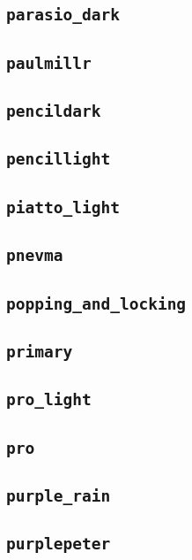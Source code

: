 \subsection{\texttt{parasio\_dark}}
\newpage
\subsection{\texttt{paulmillr}}
\newpage
\subsection{\texttt{pencildark}}
\newpage
\subsection{\texttt{pencillight}}
\newpage
\subsection{\texttt{piatto\_light}}
\newpage
\subsection{\texttt{pnevma}}
\newpage
\subsection{\texttt{popping\_and\_locking}}
\newpage
\subsection{\texttt{primary}}
\newpage
\subsection{\texttt{pro\_light}}
\newpage
\subsection{\texttt{pro}}
\newpage
\subsection{\texttt{purple\_rain}}
\newpage
\subsection{\texttt{purplepeter}}
\newpage
